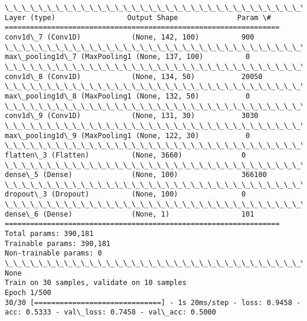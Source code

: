 \documentclass[11pt]{article}
\begin{document}
    \begin{Verbatim}[commandchars=\\\{\}]
\_\_\_\_\_\_\_\_\_\_\_\_\_\_\_\_\_\_\_\_\_\_\_\_\_\_\_\_\_\_\_\_\_\_\_\_\_\_\_\_\_\_\_\_\_\_\_\_\_\_\_\_\_\_\_\_\_\_\_\_\_\_\_\_\_
Layer (type)                 Output Shape              Param \#   
=================================================================
conv1d\_7 (Conv1D)            (None, 142, 100)          900       
\_\_\_\_\_\_\_\_\_\_\_\_\_\_\_\_\_\_\_\_\_\_\_\_\_\_\_\_\_\_\_\_\_\_\_\_\_\_\_\_\_\_\_\_\_\_\_\_\_\_\_\_\_\_\_\_\_\_\_\_\_\_\_\_\_
max\_pooling1d\_7 (MaxPooling1 (None, 137, 100)          0         
\_\_\_\_\_\_\_\_\_\_\_\_\_\_\_\_\_\_\_\_\_\_\_\_\_\_\_\_\_\_\_\_\_\_\_\_\_\_\_\_\_\_\_\_\_\_\_\_\_\_\_\_\_\_\_\_\_\_\_\_\_\_\_\_\_
conv1d\_8 (Conv1D)            (None, 134, 50)           20050     
\_\_\_\_\_\_\_\_\_\_\_\_\_\_\_\_\_\_\_\_\_\_\_\_\_\_\_\_\_\_\_\_\_\_\_\_\_\_\_\_\_\_\_\_\_\_\_\_\_\_\_\_\_\_\_\_\_\_\_\_\_\_\_\_\_
max\_pooling1d\_8 (MaxPooling1 (None, 132, 50)           0         
\_\_\_\_\_\_\_\_\_\_\_\_\_\_\_\_\_\_\_\_\_\_\_\_\_\_\_\_\_\_\_\_\_\_\_\_\_\_\_\_\_\_\_\_\_\_\_\_\_\_\_\_\_\_\_\_\_\_\_\_\_\_\_\_\_
conv1d\_9 (Conv1D)            (None, 131, 30)           3030      
\_\_\_\_\_\_\_\_\_\_\_\_\_\_\_\_\_\_\_\_\_\_\_\_\_\_\_\_\_\_\_\_\_\_\_\_\_\_\_\_\_\_\_\_\_\_\_\_\_\_\_\_\_\_\_\_\_\_\_\_\_\_\_\_\_
max\_pooling1d\_9 (MaxPooling1 (None, 122, 30)           0         
\_\_\_\_\_\_\_\_\_\_\_\_\_\_\_\_\_\_\_\_\_\_\_\_\_\_\_\_\_\_\_\_\_\_\_\_\_\_\_\_\_\_\_\_\_\_\_\_\_\_\_\_\_\_\_\_\_\_\_\_\_\_\_\_\_
flatten\_3 (Flatten)          (None, 3660)              0         
\_\_\_\_\_\_\_\_\_\_\_\_\_\_\_\_\_\_\_\_\_\_\_\_\_\_\_\_\_\_\_\_\_\_\_\_\_\_\_\_\_\_\_\_\_\_\_\_\_\_\_\_\_\_\_\_\_\_\_\_\_\_\_\_\_
dense\_5 (Dense)              (None, 100)               366100    
\_\_\_\_\_\_\_\_\_\_\_\_\_\_\_\_\_\_\_\_\_\_\_\_\_\_\_\_\_\_\_\_\_\_\_\_\_\_\_\_\_\_\_\_\_\_\_\_\_\_\_\_\_\_\_\_\_\_\_\_\_\_\_\_\_
dropout\_3 (Dropout)          (None, 100)               0         
\_\_\_\_\_\_\_\_\_\_\_\_\_\_\_\_\_\_\_\_\_\_\_\_\_\_\_\_\_\_\_\_\_\_\_\_\_\_\_\_\_\_\_\_\_\_\_\_\_\_\_\_\_\_\_\_\_\_\_\_\_\_\_\_\_
dense\_6 (Dense)              (None, 1)                 101       
=================================================================
Total params: 390,181
Trainable params: 390,181
Non-trainable params: 0
\_\_\_\_\_\_\_\_\_\_\_\_\_\_\_\_\_\_\_\_\_\_\_\_\_\_\_\_\_\_\_\_\_\_\_\_\_\_\_\_\_\_\_\_\_\_\_\_\_\_\_\_\_\_\_\_\_\_\_\_\_\_\_\_\_
None
Train on 30 samples, validate on 10 samples
Epoch 1/500
30/30 [==============================] - 1s 20ms/step - loss: 0.9458 - acc: 0.5333 - val\_loss: 0.7458 - val\_acc: 0.5000

\end{Verbatim}
\end{document}
